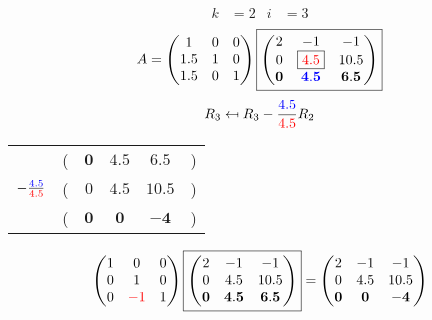\documentclass[pdf]{beamer}
\begin{document}
\begin{frame}{}\begin{align*} k &= 2 & i &= 3 \end{align*} $$A=\begin{pmatrix}1&0&0\\1.5&1&0\\1.5&0&1\end{pmatrix} \boxed{\begin{pmatrix}2&-1&-1\\0&\boxed{{\color{red}4.5}}&10.5\\\mathbf{0}&\mathbf{{\color{blue}4.5}}&\mathbf{6.5}\end{pmatrix}} $$ $$R_3 \mapsfrom R_3 - \frac{{\color{blue}4.5}}{{\color{red}4.5}} R_2$$ \begin{center}\begin{tabular}{cccccc}  &(& $ \mathbf{0} $ & $ \mathbf{4.5} $ & $ \mathbf{6.5} $ &)\\$ -\frac{{\color{blue}4.5}}{{\color{red}4.5}} $&(& $ 0 $ & $ 4.5 $ & $ 10.5 $ &)\\\hline  &(& $ \mathbf{0} $ & $ \mathbf{0} $ & $ \mathbf{-4} $ &) \end{tabular}\end{center} $$ \begin{pmatrix}1&0&0\\0&1&0\\0&{\color{red}-1}&1\end{pmatrix} \boxed{\begin{pmatrix}2&-1&-1\\0&4.5&10.5\\\mathbf{0}&\mathbf{4.5}&\mathbf{6.5}\end{pmatrix}} = \begin{pmatrix}2&-1&-1\\0&4.5&10.5\\\mathbf{0}&\mathbf{0}&\mathbf{-4}\end{pmatrix} $$\end{frame}
\end{document}
